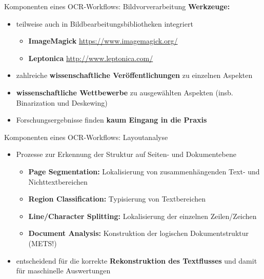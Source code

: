 \documentclass{bbawslides}
\begin{document}
\begin{bbawslide}{Komponenten eines OCR-Workflows: Bildvorverarbeitung}
  \vspace*{7mm}%
  \centerslidestrue%
  \textbf{Werkzeuge:}
  \begin{itemize}
    \item teilweise auch in Bildbearbeitungsbibliotheken integriert
    \begin{itemize}\small
      \item \textbf{ImageMagick} \url{https://www.imagemagick.org/}
      \item \textbf{Leptonica} \url{http://www.leptonica.com/}
    \end{itemize}
    \item zahlreiche \textbf{wissenschaftliche Veröffentlichungen} zu einzelnen Aspekten
    \item \textbf{wissenschaftliche Wettbewerbe} zu ausgewählten Aspekten (insb. Binarization und Deskewing)
    \item Forschungsergebnisse finden \textbf{kaum Eingang in die Praxis}
  \end{itemize}
\end{bbawslide}

\begin{bbawslide}{Komponenten eines OCR-Workflows: Layoutanalyse}
  \vspace*{7mm}%
  \centerslidestrue%
  \begin{itemize}
    \item Prozesse zur Erkennung der Struktur auf Seiten- und Dokumentebene
    \begin{itemize}\small
      \item \textbf{Page Segmentation:} Lokalisierung von zusammenhängenden Text- und Nichttextbereichen
      \item \textbf{Region Classification:} Typisierung von Textbereichen
      \item \textbf{Line/Character Splitting:} Lokalisierung der einzelnen Zeilen/Zeichen
      \item \textbf{Document Analysis:} Konstruktion der logischen Dokumentstruktur (METS!)
    \end{itemize}
    \item entscheidend für die korrekte \textbf{Rekonstruktion des Textflusses} und damit für maschinelle Auswertungen
  \end{itemize}
\end{bbawslide}
\end{document}
